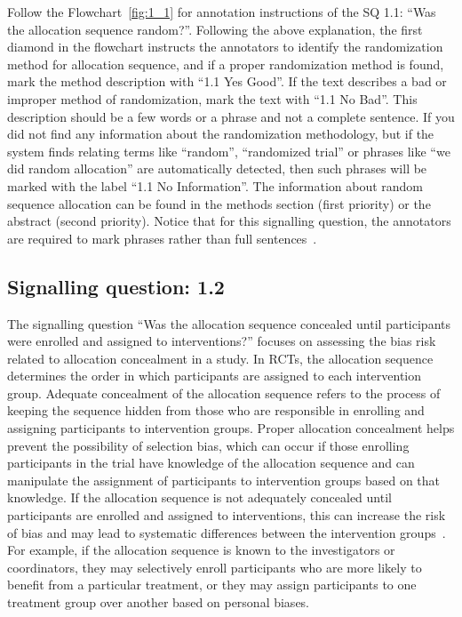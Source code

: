 \documentclass[sn-mathphys,Numbered]{sn-jnl}%
\begin{document}
Follow the Flowchart~\ref{fig:1_1} for annotation instructions of the SQ 1.1: ``Was the allocation sequence random?''.
Following the above explanation, the first diamond in the flowchart instructs the annotators to identify the randomization method for allocation sequence, and if a proper randomization method is found, mark the method description with ``1.1 Yes Good''.
If the text describes a bad or improper method of randomization, mark the text with ``1.1 No Bad''.
This description should be a few words or a phrase and not a complete sentence.
If you did not find any information about the randomization methodology, but if the system finds relating terms like ``random'', ``randomized trial'' or phrases like ``we did random allocation'' are automatically detected, then such phrases will be marked with the label ``1.1 No Information''.
The information about random sequence allocation can be found in the methods section (first priority) or the abstract (second priority).
Notice that for this signalling question, the annotators are required to mark phrases rather than full sentences~\cite{sterne2019rob,saltaji2017randomized}.
%
%
%
\subsection*{Signalling question: 1.2}
%
The signalling question ``Was the allocation sequence concealed until participants were enrolled and assigned to interventions?'' focuses on assessing the bias risk related to allocation concealment in a study.
In RCTs, the allocation sequence determines the order in which participants are assigned to each intervention group.
Adequate concealment of the allocation sequence refers to the process of keeping the sequence hidden from those who are responsible in enrolling and assigning participants to intervention groups.
Proper allocation concealment helps prevent the possibility of selection bias, which can occur if those enrolling participants in the trial have knowledge of the allocation sequence and can manipulate the assignment of participants to intervention groups based on that knowledge.
If the allocation sequence is not adequately concealed until participants are enrolled and assigned to interventions, this can increase the risk of bias and may lead to systematic differences between the intervention groups~\cite{bello2017contemporary}.
For example, if the allocation sequence is known to the investigators or coordinators, they may selectively enroll participants who are more likely to benefit from a particular treatment, or they may assign participants to one treatment group over another based on personal biases.
\end{document}
